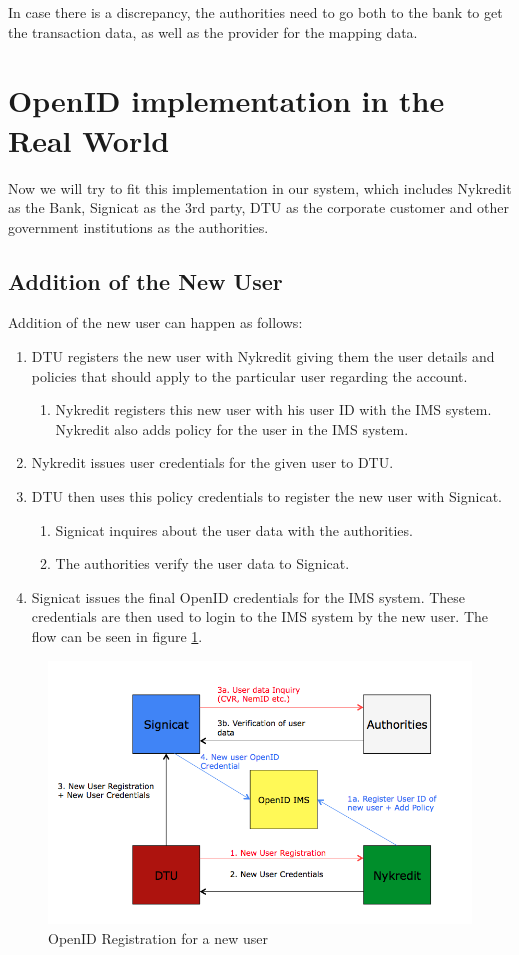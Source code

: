 In case there is a discrepancy, the authorities need to go both to the bank to get the transaction data, as well as the provider for the mapping data.
\section {OpenID implementation in the Real World}
Now we will try to fit this implementation in our system, which includes Nykredit as the Bank, Signicat as the 3rd party, DTU as the corporate customer and other government institutions as the authorities.
\subsection{Addition of the New User}
Addition of the new user can happen as follows:
\begin{enumerate}
	\item DTU registers the new user with Nykredit giving them the user details and policies that should apply to the particular user regarding the account. 
	\begin{enumerate}
		\item Nykredit registers this new user with his user ID with the IMS system. Nykredit also adds policy for the user in the IMS system.
	\end{enumerate}
	\item Nykredit issues user credentials for the given user to DTU.
	\item DTU then uses this policy credentials to register the new user with Signicat. 
	\begin{enumerate}
		\item Signicat inquires about the user data with the authorities.
		\item The authorities verify the user data to Signicat.
	\end{enumerate}
	\item Signicat issues the final OpenID credentials for the IMS system.  These credentials are then used to login to the IMS system by the new user.
	The flow can be seen in figure \ref{fig:OpenID-Real}.
\end{enumerate}
\begin{figure}[h]
	\centering
	\includegraphics[width=\textwidth]{figures/OpenID-Real}
	\caption{OpenID Registration for a new user}
	\label{fig:OpenID-Real}
\end{figure}

